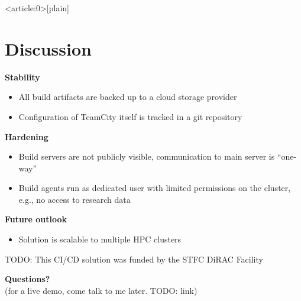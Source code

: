 \documentclass[english,xcolor=pst,11pt]{beamer}
\begin{document}
{ %
    \begin{frame}<article:0>[plain]
     \end{frame}
}

\section{Discussion}
\begin{frame}
 \textbf{Stability}
 \begin{itemize}
  \item All build artifacts are backed up to a cloud storage provider
  \item Configuration of TeamCity itself is tracked in a git repository
  \end{itemize}
  \textbf{Hardening}
  \begin{itemize}
  \item Build servers are not publicly visible, communication to main server is ``one-way''
  \item Build agents run as dedicated  user with limited permissions on the cluster, e.g., no access to research data
 \end{itemize}
 \textbf{Future outlook}

 \begin{itemize}
  \item Solution is scalable to multiple HPC clusters
 \end{itemize}
TODO: This CI/CD solution was funded by the STFC DiRAC Facility
\end{frame}


\begin{frame}
 \Large{\textbf{Questions?}} \\ \vfill
 \small{(for a live demo, come talk to me later. TODO: link)}
\end{frame}
\end{document}
